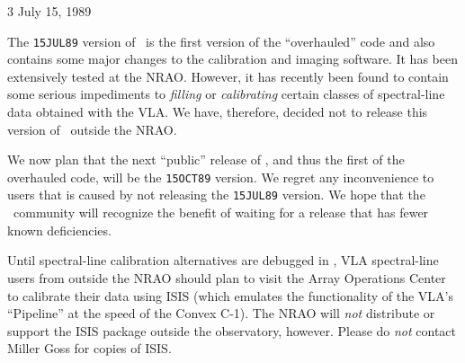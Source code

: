 %


 {3} {July 15, 1989}


    The {\tt 15JUL89} version of \AIPS\ is the first version of the
``overhauled'' code and also contains some major changes to the
calibration and imaging software.  It has been extensively tested at
the \hbox{NRAO}.  However, it has recently been found to contain some
serious impediments to {\it filling} or {\it calibrating} certain
classes of spectral-line data obtained with the \hbox{VLA}. We have,
therefore, decided not to release this version of \AIPS\ outside the
\hbox{NRAO}.

     We now plan that the next ``public'' release of \AIPS, and thus
the first of the overhauled code, will be the {\tt 15OCT89} version.
We regret any inconvenience to users that is caused by not releasing
the {\tt 15JUL89} version.  We hope that the \AIPS\ community will
recognize the benefit of waiting for a release that has fewer known
deficiencies.

    Until spectral-line calibration alternatives are debugged in \AIPS,
VLA spectral-line users from outside the NRAO should plan to visit the
Array Operations Center to calibrate their data using ISIS (which emulates
the functionality of the VLA's ``Pipeline'' at the speed of the Convex C-1).
The NRAO will {\it not} distribute or support the ISIS package outside
the observatory, however.  Please do {\it not} contact Miller Goss for
copies of \hbox{ISIS}.

